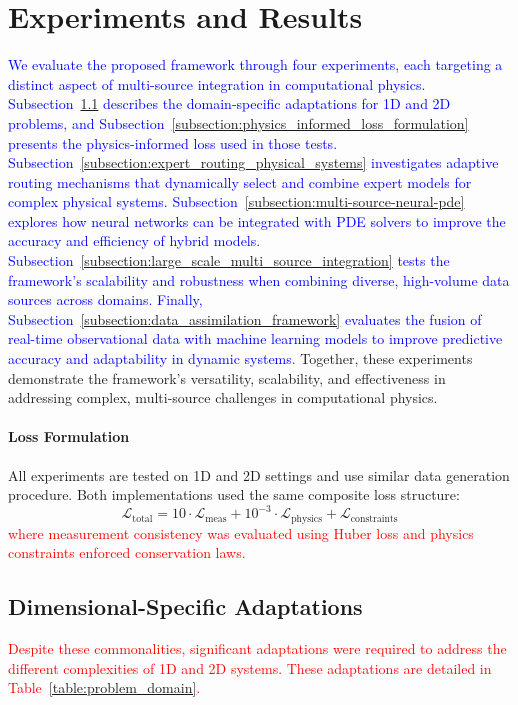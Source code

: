 \documentclass[preprint,12pt,authoryear]{elsarticle}
\begin{document}
\section{Experiments and Results}
\label{section:experiments_results}

\textcolor{blue}{We evaluate the proposed framework through four experiments, each targeting a distinct aspect of multi-source integration in computational physics. Subsection~\ref{subsection:domain_specific_adaptations} describes the domain-specific adaptations for 1D and 2D problems, and Subsection~\ref{subsection:physics_informed_loss_formulation} presents the physics-informed loss used in those tests. Subsection~\ref{subsection:expert_routing_physical_systems} investigates adaptive routing mechanisms that dynamically select and combine expert models for complex physical systems. Subsection~\ref{subsection:multi-source-neural-pde} explores how neural networks can be integrated with PDE solvers to improve the accuracy and efficiency of hybrid models. Subsection~\ref{subsection:large_scale_multi_source_integration} tests the framework's scalability and robustness when combining diverse, high-volume data sources across domains. Finally, Subsection~\ref{subsection:data_assimilation_framework} evaluates the fusion of real-time observational data with machine learning models to improve predictive accuracy and adaptability in dynamic systems.} Together, these experiments demonstrate the framework’s versatility, scalability, and effectiveness in addressing complex, multi-source challenges in computational physics.



\paragraph{Loss Formulation} All experiments are tested on 1D and 2D settings and use similar data generation procedure. Both implementations used the same composite loss structure:
\[
\mathcal{L}_{\text{total}} = 10 \cdot \mathcal{L}_{\text{meas}} + 10^{-3} \cdot \mathcal{L}_{\text{physics}} + \mathcal{L}_{\text{constraints}}
\]
\textcolor{red}{where measurement consistency was evaluated using Huber loss and physics constraints enforced conservation laws.}

\subsection{Dimensional-Specific Adaptations}
\label{subsection:domain_specific_adaptations}
\textcolor{red}{Despite these commonalities, significant adaptations were required to address the different complexities of 1D and 2D systems. These adaptations are detailed in Table~\ref{table:problem_domain}.}
\end{document}
